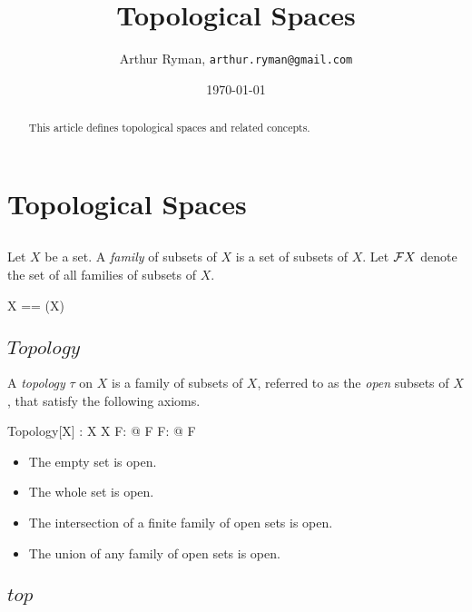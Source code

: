 \documentclass[11pt, oneside]{article}
\title{Topological Spaces}
\author{Arthur Ryman, {\tt arthur.ryman@gmail.com}}
\date{\today}
\begin{document}
\maketitle

\begin{abstract}
This article defines topological spaces and related concepts.
\end{abstract}

\section{Topological Spaces}

\subsection{}

Let $X$ be a set.
A {\it family} of subsets of $X$ is a set of subsets of $X$.
Let $\mathcal{F} X$ denote the set of all families of subsets of $X$.

\begin{zed}
	\family X == \power(\power X)
\end{zed}

\subsection{$Topology$}

A {\it topology} $\tau$ on $X$ is a family of subsets of $X$, referred to as the {\it open} subsets of $X$, that satisfy the following axioms.

\begin{schema}{Topology}[X]
	\tau: \family X
\where
	\emptyset \in \tau
\also
	X \in \tau
\also
	\forall F: \finset \tau @ \bigcap F \in \tau
\also
	\forall F: \power \tau @ \bigcup F \in \tau
\end{schema}

\begin{itemize}
\item The empty set is open.
\item The whole set is open.
\item The intersection of a finite family of open sets is open.
\item The union of any family of open sets is open. 
\end{itemize}

\subsection{$top$}
\end{document}
